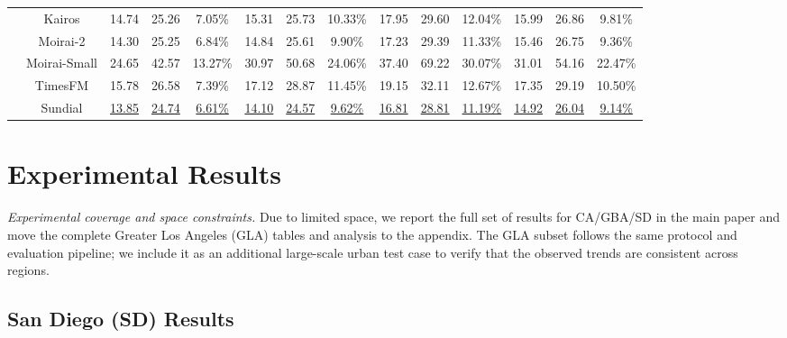 \documentclass[10pt]{article}
\begin{document}
\begin{table}[t]
{\begin{tabular}{c|c|c|c|c|c|c|c|c|c|c|c|c|c}
& Kairos
& 14.74 & 25.26 & 7.05\% 
& 15.31 & 25.73 & 10.33\% 
& 17.95 & 29.60 & 12.04\% 
& 15.99 & 26.86 & 9.81\% \\

& Moirai-2
& 14.30 & 25.25 & 6.84\% 
& 14.84 & 25.61 & 9.90\% 
& 17.23 & 29.39 & 11.33\% 
& 15.46 & 26.75 & 9.36\% \\

& Moirai-Small
& 24.65 & 42.57 & 13.27\% 
& 30.97 & 50.68 & 24.06\% 
& 37.40 & 69.22 & 30.07\% 
& 31.01 & 54.16 & 22.47\% \\

& TimesFM 
& 15.78 & 26.58 & 7.39\% 
& 17.12 & 28.87 & 11.45\% 
& 19.15 & 32.11 & 12.67\% 
& 17.35 & 29.19 & 10.50\% \\

& Sundial
& \underline{13.85} & \underline{24.74} & \underline{6.61\%} 
& \underline{14.10} & \underline{24.57} & \underline{9.62\%} 
& \underline{16.81} & \underline{28.81} & \underline{11.19\%} 
& \underline{14.92} & \underline{26.04} & \underline{9.14\%} \\

\bottomrule
\end{tabular}
}
\end{table}




\section{Experimental Results}
\label{sec:results}

\textit{Experimental coverage and space constraints.}
Due to limited space, we report the full set of results for CA/GBA/SD in the main paper and move the complete
Greater Los Angeles (GLA) tables and analysis to the appendix. The GLA subset follows the same protocol and
evaluation pipeline; we include it as an additional large-scale urban test case to verify that the observed
trends are consistent across regions.

\subsection{San Diego (SD) Results}
\label{sec:sd_results}

\end{document}

